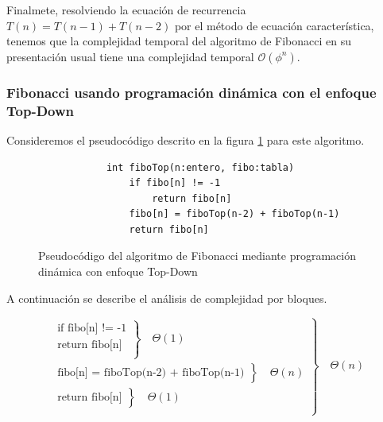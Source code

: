     Finalmete, resolviendo la ecuación de recurrencia $T(n)=T(n-1)+T(n-2)$ por el método de ecuación característica, tenemos que la complejidad temporal del algoritmo de Fibonacci en su presentación usual tiene una complejidad temporal $\mathcal{O}(\phi^{n})$.
    
    \subsubsection*{Fibonacci usando programación dinámica con el enfoque Top-Down}
    Consideremos el pseudocódigo descrito en la figura \ref{PseudocodigoFiboTop} para este algoritmo.
    
    \begin{figure}[h!]
        \centering
        \begin{verbatim}
            int fiboTop(n:entero, fibo:tabla)
                if fibo[n] != -1
                    return fibo[n]
                fibo[n] = fiboTop(n-2) + fiboTop(n-1)
                return fibo[n]
        \end{verbatim}  
        \caption{Pseudocódigo del algoritmo de Fibonacci mediante programación dinámica con enfoque Top-Down}
        \label{PseudocodigoFiboTop}
    \end{figure}
    
    A continuación se describe el análisis de complejidad por bloques.
    
    \begin{equation*}
        \left.
            \begin{aligned}
                \left.
                    \begin{aligned}
                        \text{if fibo[n] != -1}\\
                        \text{return fibo[n]}\\
                    \end{aligned}
                \right\}
                \quad\Theta(1)
                \\
                \left.
                    \begin{aligned}
                        \text{fibo[n] = fiboTop(n-2) + fiboTop(n-1)}
                    \end{aligned}
                \right\}
                \quad\Theta(n)
                \\
                \left.
                    \begin{aligned}
                        \text{return fibo[n]}
                    \end{aligned}
                \right\}
                \quad\Theta(1)
                \\
            \end{aligned}
        \right\}
        \quad\Theta(n)
    \end{equation*} 
    
